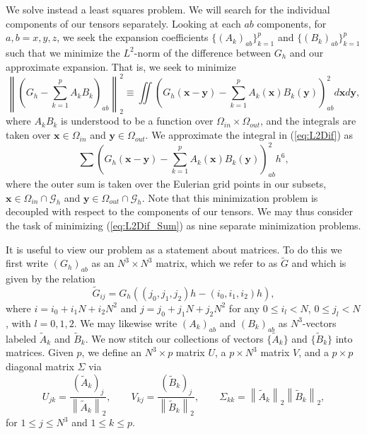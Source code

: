\documentclass[preprint,12pt]{elsarticle}
\newcommand{\norm}[1]{\left\lVert#1\right\rVert}
\newcommand{\B}[1]{\mathbf{#1}}
\newcommand{\C}[1]{\mathcal{#1}}
\newcommand{\ti}[1]{\tilde{#1}}
\begin{document}
We solve instead a least squares problem. We will search for the individual components of our tensors separately. Looking at each $ab$ components, for $a,b=x,y,z$, we seek the expansion coefficients $\{(A_k)_{ab}\}_{k=1}^p$ and $\{(B_k)_{ab}\}_{k=1}^p$ such that we minimize the $L^2$-norm of the difference between $G_h$ and our approximate expansion. That is, we seek to minimize
\begin{equation}
\norm{\left(G_h - \sum_{k = 1}^p A_k B_k\right)_{ab}}^2_2 \equiv
\iint
\left(G_h(\B{x} - \B{y}) - \sum_{k = 1}^p A_k(\B{x}) B_k(\B{y})\right)_{ab}^2
d\B{x} d\B{y},
\label{eq:L2Dif}
\end{equation}
where $A_k B_k$ is understood to be a function over $\Omega_{in}\times\Omega_{out}$, and the integrals are taken over $\B{x}\in\Omega_{in}$ and $\B{y}\in\Omega_{out}$. We approximate the integral in (\ref{eq:L2Dif}) as
\begin{equation}
\sum
\left(G_h(\B{x} - \B{y}) - \sum_{k = 1}^p A_k(\B{x}) B_k(\B{y})\right)_{ab}^2 h^6,
\label{eq:L2Dif_Sum}
\end{equation}
where the outer sum is taken over the Eulerian grid points in our subsets, $\B{x}\in\Omega_{in}\cap\C{G}_h$ and $\B{y}\in\Omega_{out}\cap\C{G}_h$.
Note that this minimization problem is decoupled with respect to the components of our tensors. We may thus consider the task of minimizing (\ref{eq:L2Dif_Sum}) as nine separate minimization problems.

It is useful to view our problem as a statement about matrices. To do this we first write $(G_h)_{ab}$ as an $N^3\times N^3$ matrix, which we refer to as $\ti{G}$ and which is given by the relation
\begin{equation}
\ti{G}_{ij} = G_h((j_0,j_1,j_2)h-(i_0,i_1,i_2)h),
\end{equation}
where $i = i_0 + i_1N + i_2N^2$ and $j = j_0 + j_1N + j_2N^2$ for any $0\leq i_l < N$, $0\leq j_l < N$, with $l=0,1,2$. We may likewise write $(A_k)_{ab}$ and $(B_k)_{ab}$ as $N^3$-vectors labeled $\ti{A}_k$ and $\ti{B}_k$.
We now stitch our collections of vectors $\{\ti{A}_k\}$ and $\{\ti{B}_k\}$ into matrices. Given $p$, we define an $N^3\times p$ matrix $U$, a $p\times N^3$ matrix $V$, and a $p\times p$ diagonal matrix $\Sigma$ via
\begin{equation}
U_{jk} = \frac{(\ti{A}_k)_j}{\norm{\ti{A}_k}_2},
\qquad
V_{kj} = \frac{(\ti{B}_k)_j}{\norm{\ti{B}_k}_2},
\qquad
\Sigma_{kk} = \norm{\ti{A}_k}_2 \norm{\ti{B}_k}_2,
\end{equation}
for $1\leq j\leq N^3$ and $1\leq k\leq p$.
\end{document}
